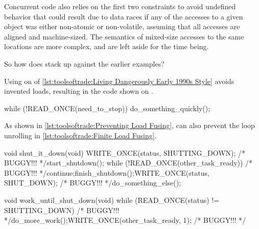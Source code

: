Concurrent code also relies on the first two constraints to avoid
undefined behavior that could result due to data races if any of the
accesses to a given object was either non-atomic or non-volatile,
assuming that all accesses are aligned and machine-sized.
The semantics of mixed-size accesses to the same locations are more
complex, and are left aside for the time being.

So how does  stack up against the earlier examples?

\begin{fcvref}
Using  on  of
\cref{lst:toolsoftrade:Living Dangerously Early 1990s Style}
avoids invented loads,
resulting in the code shown on .
\end{fcvref}

\begin{listing}
\begin{fcvlabel}
\begin{VerbatimL}[commandchars=\\\{\}]
while (!READ_ONCE(need_to_stop))
	do_something_quickly();
\end{VerbatimL}
\end{fcvlabel}
\caption{Preventing Load Fusing}
\label{lst:toolsoftrade:Preventing Load Fusing}
\end{listing}

As shown in
\cref{lst:toolsoftrade:Preventing Load Fusing},
 can also prevent the loop unrolling in
\cref{lst:toolsoftrade:Finite Load Fusing}.

\begin{listing}
\begin{fcvlabel}
\begin{VerbatimL}[commandchars=\\\[\]]
void shut_it_down(void)
{
	WRITE_ONCE(status, SHUTTING_DOWN); /* BUGGY!!! */\lnlbl[store:a]
	start_shutdown();
	while (!READ_ONCE(other_task_ready)) /* BUGGY!!! */\lnlbl[loop:b]
		continue;\lnlbl[loop:e]
	finish_shutdown();\lnlbl[finish]
	WRITE_ONCE(status, SHUT_DOWN); /* BUGGY!!! */\lnlbl[store:b]
	do_something_else();
}

void work_until_shut_down(void)
{
	while (READ_ONCE(status) != SHUTTING_DOWN) /* BUGGY!!! */
		do_more_work();
	WRITE_ONCE(other_task_ready, 1); /* BUGGY!!! */
}
\end{VerbatimL}
\end{fcvlabel}
\caption{Preventing Store Fusing and Invented Stores}
\label{lst:toolsoftrade:Preventing Store Fusing and Invented Stores}
\end{listing}

